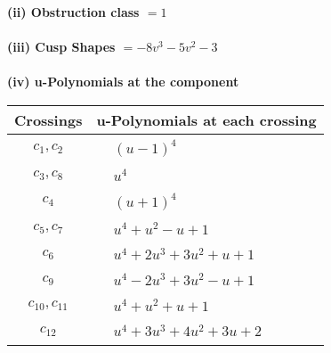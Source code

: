 \documentclass[1p]{elsarticle_modified}
\theoremstyle{definition}
\begin{document}
\flushleft \textbf{(ii) Obstruction class $= 1$}\\~\\
\flushleft \textbf{(iii) Cusp Shapes $= -8 v^3-5 v^2-3$}\\~\\
\newpage\renewcommand{\arraystretch}{1}
\flushleft \textbf{(iv) u-Polynomials at the component}\newline \\
\begin{tabular}{m{50pt}|m{274pt}}
Crossings & \hspace{64pt}u-Polynomials at each crossing \\
\hline $$\begin{aligned}c_{1},c_{2}\end{aligned}$$&$\begin{aligned}
&(u-1)^4
\end{aligned}$\\
\hline $$\begin{aligned}c_{3},c_{8}\end{aligned}$$&$\begin{aligned}
&u^4
\end{aligned}$\\
\hline $$\begin{aligned}c_{4}\end{aligned}$$&$\begin{aligned}
&(u+1)^4
\end{aligned}$\\
\hline $$\begin{aligned}c_{5},c_{7}\end{aligned}$$&$\begin{aligned}
&u^4+u^2- u+1
\end{aligned}$\\
\hline $$\begin{aligned}c_{6}\end{aligned}$$&$\begin{aligned}
&u^4+2 u^3+3 u^2+u+1
\end{aligned}$\\
\hline $$\begin{aligned}c_{9}\end{aligned}$$&$\begin{aligned}
&u^4-2 u^3+3 u^2- u+1
\end{aligned}$\\
\hline $$\begin{aligned}c_{10},c_{11}\end{aligned}$$&$\begin{aligned}
&u^4+u^2+u+1
\end{aligned}$\\
\hline $$\begin{aligned}c_{12}\end{aligned}$$&$\begin{aligned}
&u^4+3 u^3+4 u^2+3 u+2
\end{aligned}$\\
\hline
\end{tabular}\\~\\
\end{document}
